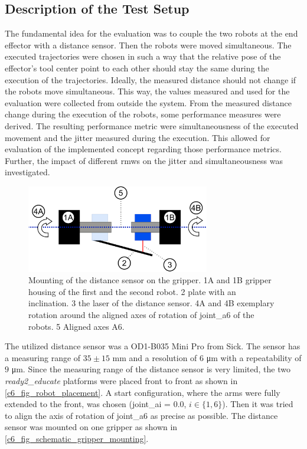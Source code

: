 \subsection{Description of the Test Setup}\label{c6_sec_description}
The fundamental idea for the evaluation was to couple the two robots at the end effector with a distance sensor. Then the robots were moved simultaneous. The executed trajectories were chosen in such a way that the relative pose of the effector's tool center point to each other should stay the same during the execution of the trajectories. Ideally, the measured distance should not change if the robots move simultaneous. This way, the values measured and used for the evaluation were collected from outside the system. \newline
From the measured distance change during the execution of the robots, some performance measures were derived. The resulting performance metric were simultaneousness of the executed movement and the jitter measured during the execution. This allowed for evaluation of the implemented concept regarding those performance metrics. Further, the impact of different \glspl{rmw} on the jitter and simultaneousness was investigated. \newline
\begin{figure}
\includegraphics[width=8cm]{Figures/c6/schematic_messurement_rotation.pdf}
\caption{Mounting of the distance sensor on the gripper. 1A and 1B gripper housing of the first and the second robot. 2 plate with an inclination. 3 the laser of the distance sensor. 4A and 4B exemplary rotation around the aligned axes of rotation of joint\_a6 of the robots. 5 Aligned axes A6.} \label{c6_fig_schematic_gripper_mounting}
\end{figure}
The utilized distance sensor was a OD1-B035 Mini Pro from Sick. The sensor has a measuring range of $35\pm15$ \si{\milli\meter} and a resolution of $6$ \si{\micro\meter} with a repeatability of $9$ \si{\micro\meter}. Since the measuring range of the distance sensor is very limited, the two \textit{ready2\_educate} platforms were placed front to front as shown in \autoref{c6_fig_robot_placement}. A start configuration, where the arms were fully extended to the front, was chosen (joint\_ai = 0.0, $i \in\{1,6\}$). Then it was tried to align the axis of rotation of joint\_a6 as precise as possible. The distance sensor was mounted on one gripper as shown in \autoref{c6_fig_schematic_gripper_mounting}.\newline
